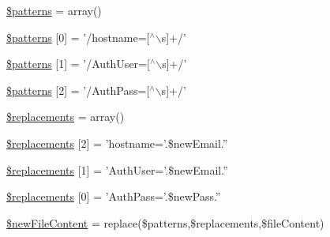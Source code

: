 \begin{DoxyCompactItemize}
\item 
\hyperlink{changeEmail_8php_a99c668c59ad650ca9b31ad5313dc5720}{\$patterns} = array()
\item 
\hyperlink{changeEmail_8php_afbc27b9f7ed25335ed52087da7e8c292}{\$patterns} \mbox{[}0\mbox{]} = '/hostname=\mbox{[}$^\wedge$$\backslash$s\mbox{]}+/'
\item 
\hyperlink{changeEmail_8php_ae31d13193d3c853d71ef3f7abfd40194}{\$patterns} \mbox{[}1\mbox{]} = '/\-Auth\-User=\mbox{[}$^\wedge$$\backslash$s\mbox{]}+/'
\item 
\hyperlink{changeEmail_8php_a8a5a9dd58c17ede53c8a33a619568a3c}{\$patterns} \mbox{[}2\mbox{]} = '/\-Auth\-Pass=\mbox{[}$^\wedge$$\backslash$s\mbox{]}+/'
\item 
\hyperlink{changeEmail_8php_a93cb3f67ace379a71de4fb00bcc7a605}{\$replacements} = array()
\item 
\hyperlink{changeEmail_8php_a46ef0ff9b63f39252dc8d8ffe01fe186}{\$replacements} \mbox{[}2\mbox{]} = 'hostname='.\$new\-Email.''
\item 
\hyperlink{changeEmail_8php_a41cab20bd9e089d68362e6b9489510a8}{\$replacements} \mbox{[}1\mbox{]} = '\-Auth\-User='.\$new\-Email.''
\item 
\hyperlink{changeEmail_8php_a145791c674c2ced0890355ae5bdb6847}{\$replacements} \mbox{[}0\mbox{]} = '\-Auth\-Pass='.\$new\-Pass.''
\item 
\hyperlink{changeEmail_8php_abe4aedd9ba309b8e7a560c0436650e25}{\$new\-File\-Content} = replace(\$patterns,\$replacements,\$file\-Content)
\end{DoxyCompactItemize}



